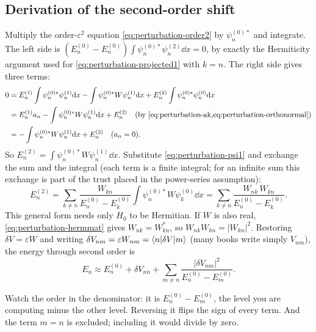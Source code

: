 \subsection{Derivation of the second-order shift}

Multiply the order-$\varepsilon^2$ equation \cref{eq:perturbation-order2} by $\psi_n^{(0)*}$ and integrate. The left side is $(E_n^{(0)}-E_n^{(0)})\int\psi_n^{(0)*}\psi_n^{(2)}\dd x=0$, by exactly the Hermiticity argument used for \cref{eq:perturbation-projected1} with $k=n$. The right side gives three terms:
\begin{align*}
0&=E_n^{(1)}\int\psi_n^{(0)*}\psi_n^{(1)}\dd x-\int\psi_n^{(0)*}W\psi_n^{(1)}\dd x+E_n^{(2)}\int\psi_n^{(0)*}\psi_n^{(0)}\dd x\\
&=E_n^{(1)}a_n-\int\psi_n^{(0)*}W\psi_n^{(1)}\dd x+E_n^{(2)}
\quad\text{(by \cref{eq:perturbation-ak,eq:perturbation-orthonormal})}\\
&=-\int\psi_n^{(0)*}W\psi_n^{(1)}\dd x+E_n^{(2)}
\quad\text{($a_n=0$)}.
\end{align*}
So $E_n^{(2)}=\int\psi_n^{(0)*}W\psi_n^{(1)}\dd x$. Substitute \cref{eq:perturbation-psi1} and exchange the sum and the integral (each term is a finite integral; for an infinite sum this exchange is part of the trust placed in the power-series assumption):
\begin{equation}
E_n^{(2)}=\sum_{k\ne n}\frac{W_{kn}}{E_n^{(0)}-E_k^{(0)}}\int\psi_n^{(0)*}W\psi_k^{(0)}\dd x
=\sum_{k\ne n}\frac{W_{nk}\,W_{kn}}{E_n^{(0)}-E_k^{(0)}} .
\label{eq:perturbation-second-general}
\end{equation}
This general form needs only $H_0$ to be Hermitian. If $W$ is also real, \cref{eq:perturbation-hermmat} gives $W_{nk}=W_{kn}^*$, so $W_{nk}W_{kn}=|W_{kn}|^2$. Restoring $\delta V=\varepsilon W$ and writing $\delta V_{nm}=\varepsilon W_{nm}=\langle n|\delta V|m\rangle$ (many books write simply $V_{nm}$), the energy through second order is
\begin{equation}
\boxed{E_n\approx E_n^{(0)}+\delta V_{nn}+\sum_{m\ne n}\frac{|\delta V_{nm}|^2}{E_n^{(0)}-E_m^{(0)}}} .
\label{eq:perturbation-second}
\end{equation}

\begin{pitfall}
Watch the order in the denominator: it is $E_n^{(0)}-E_m^{(0)}$, the level you are computing minus the other level. Reversing it flips the sign of every term. And the term $m=n$ is excluded; including it would divide by zero.
\end{pitfall}

